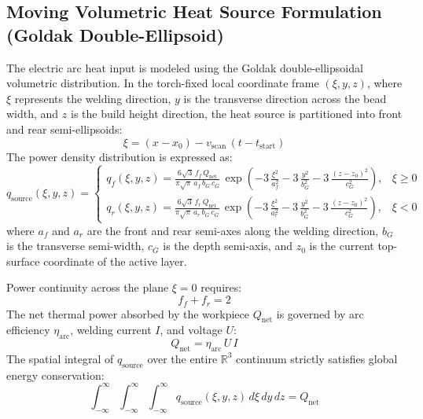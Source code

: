\documentclass[10pt,a4paper]{article}
\begin{document}
\subsection{Moving Volumetric Heat Source Formulation (Goldak Double-Ellipsoid)}
The electric arc heat input is modeled using the Goldak double-ellipsoidal volumetric distribution. In the torch-fixed local coordinate frame $(\xi, y, z)$, where $\xi$ represents the welding direction, $y$ is the transverse direction across the bead width, and $z$ is the build height direction, the heat source is partitioned into front and rear semi-ellipsoids:
\begin{equation}
\xi = (x - x_0) - v_{\mathrm{scan}}\,(t - t_{\mathrm{start}})
\end{equation}
The power density distribution is expressed as:
\begin{equation}
q_{\mathrm{source}}(\xi, y, z) = \begin{cases}
q_f(\xi, y, z) = \displaystyle \frac{6\sqrt{3}\,f_f\,Q_{\mathrm{net}}}{\pi\sqrt{\pi}\,a_f\,b_G\,c_G}\,\exp\left( -3\,\frac{\xi^2}{a_f^2} - 3\,\frac{y^2}{b_G^2} - 3\,\frac{(z - z_0)^2}{c_G^2} \right), & \xi \ge 0 \\[12pt]
q_r(\xi, y, z) = \displaystyle \frac{6\sqrt{3}\,f_r\,Q_{\mathrm{net}}}{\pi\sqrt{\pi}\,a_r\,b_G\,c_G}\,\exp\left( -3\,\frac{\xi^2}{a_r^2} - 3\,\frac{y^2}{b_G^2} - 3\,\frac{(z - z_0)^2}{c_G^2} \right), & \xi < 0
\end{cases}
\end{equation}
where $a_f$ and $a_r$ are the front and rear semi-axes along the welding direction, $b_G$ is the transverse semi-width, $c_G$ is the depth semi-axis, and $z_0$ is the current top-surface coordinate of the active layer.

Power continuity across the plane $\xi = 0$ requires:
\begin{equation}
f_f + f_r = 2
\end{equation}
The net thermal power absorbed by the workpiece $Q_{\mathrm{net}}$ is governed by arc efficiency $\eta_{\mathrm{arc}}$, welding current $I$, and voltage $U$:
\begin{equation}
Q_{\mathrm{net}} = \eta_{\mathrm{arc}}\,U\,I
\end{equation}
The spatial integral of $q_{\mathrm{source}}$ over the entire $\mathbb{R}^3$ continuum strictly satisfies global energy conservation:
\begin{equation}
\int_{-\infty}^{\infty}\int_{-\infty}^{\infty}\int_{-\infty}^{\infty} q_{\mathrm{source}}(\xi, y, z)\,d\xi\,dy\,dz = Q_{\mathrm{net}}
\end{equation}
\end{document}

